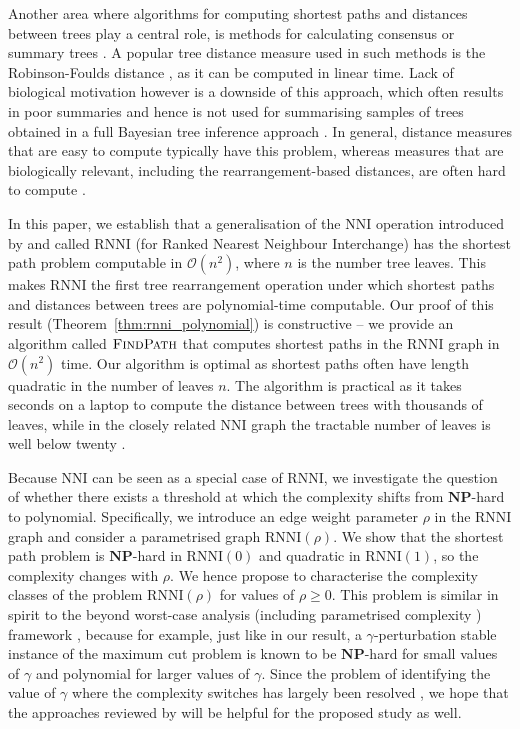\documentclass[11pt]{amsart}
\newcommand{\rnni}{\mathrm{RNNI}}
\newcommand{\findpath}{\textsc{FindPath}}
\newcommand{\nni}{\mathrm{NNI}}
\newcommand{\np}{\mathbf{NP}}
\renewcommand{\O}{\mathcal O}
\begin{document}
Another area where algorithms for computing shortest paths and distances between trees play a central role, is methods for calculating consensus or summary trees \autocite{McMorris1994-no, Bansal2010-vr, Whidden2014-sx}.
A popular tree distance measure used in such methods is the Robinson-Foulds distance \autocite{Robinson1981-fb}, as it can be computed in linear time.
Lack of biological motivation however is a downside of this approach, which often results in poor summaries and hence is not used for summarising samples of trees obtained in a full Bayesian tree inference approach \autocite{Gavryushkin2016-uu}.
In general, distance measures that are easy to compute typically have this problem, whereas measures that are biologically relevant, including the rearrangement-based distances, are often hard to compute \autocite{Whidden2018-fw}.

In this paper, we establish that a generalisation of the $\nni$ operation introduced by \textcite{Gavryushkin2018-ol} and called $\rnni$ (for Ranked Nearest Neighbour Interchange) has the shortest path problem computable in $\O(n^2)$, where $n$ is the number tree leaves.
This makes $\rnni$ the first tree rearrangement operation under which shortest paths and distances between trees are polynomial-time computable.
Our proof of this result (Theorem~\ref{thm:rnni_polynomial}) is constructive -- we provide an algorithm called $\findpath$ that computes shortest paths in the $\rnni$ graph in $\O(n^2)$ time.
Our algorithm is optimal as shortest paths often have length quadratic in the number of leaves $n$.
The algorithm is practical as it takes seconds on a laptop to compute the distance between trees with thousands of leaves, while in the closely related $\nni$ graph the tractable number of leaves is well below twenty \autocite{Li1996-zw, Whidden2016-kl}.

Because $\nni$ can be seen as a special case of $\rnni$, we investigate the question of whether there exists a threshold at which the complexity shifts from $\np$-hard to polynomial.
Specifically, we introduce an edge weight parameter $\rho$ in the $\rnni$ graph and consider a parametrised graph $\rnni(\rho)$.
We show that the shortest path problem is $\np$-hard in $\rnni(0)$ and quadratic in $\rnni(1)$, so the complexity changes with $\rho$.
We hence propose to characterise the complexity classes of the problem $\rnni(\rho)$ for values of $\rho \geq 0$.
This problem is similar in spirit to the beyond worst-case analysis (including parametrised complexity \autocite{Downey2013-nd}) framework \autocite{Roughgarden2019-to}, because for example, just like in our result, a $\gamma$-perturbation stable instance of the maximum cut problem is known \autocite{Roughgarden2019-to} to be $\np$-hard for small values of $\gamma$ and polynomial for larger values of $\gamma$.
Since the problem of identifying the value of $\gamma$ where the complexity switches has largely been resolved \autocite{Makarychev2014-ev}, we hope that the approaches reviewed by \textcite{Roughgarden2019-to} will be helpful for the proposed study as well.
\end{document}
